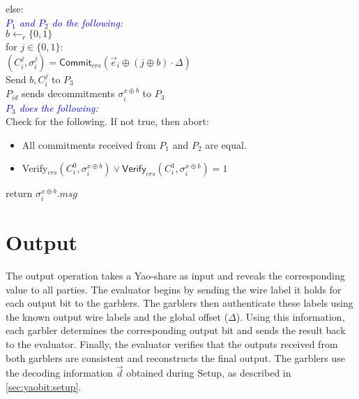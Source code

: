 \begin{protocol}[Input]
	\indent  else: \\
	\indent \indent \textcolor{blue}{\textit{$P_1$ and $P_2$ do the following:}} \\
	\indent \indent $b \gets_r \{0,1\}$ \\
	\indent \indent for $j \in \{0,1\}$: \\
	\indent \indent \indent $(C^j_i, \sigma^j_i) = \mathsf{Commit}_{crs}(\vec{e}_i \oplus (j \oplus b) \cdot \Delta)$\\
	\indent \indent \indent Send $b, C^j_i$ to $P_3$\\
	\indent \indent $P_{id}$ sends decommitments $\sigma^{x \oplus b}_i$ to $P_3$ \\
	\indent \indent \textcolor{blue}{\textit{$P_3$ does the following:}} \\
	\indent \indent Check for the following. If not true, then abort:
	\begin{itemize}[leftmargin=55pt] 
		\item \indent \indent \indent All commitments received from $P_1$ and $P_2$ are equal.
		\item \indent \indent \indent \textsf{Verify}$_{crs}(C^{0}_i, \sigma^{x \oplus b}_i) \vee \mathsf{Verify}_{crs}(C^{1}_i, \sigma^{x \oplus b}_i) = 1$
	\end{itemize}
	\indent \indent \indent return $\sigma^{x \oplus b}_i.msg$
\end{protocol}

\section{Output}

The output operation takes a Yao-share as input and reveals the corresponding value to all parties. The evaluator begins by sending the wire label it holds for each output bit to the garblers. The garblers then authenticate these labels using the known output wire labels and the global offset ($\Delta$). Using this information, each garbler determines the corresponding output bit and sends the result back to the evaluator. Finally, the evaluator verifies that the outputs received from both garblers are consistent and reconstructs the final output. The garblers use the decoding information $\vec{d}$ obtained during Setup, as described in \ref{sec:yaobit:setup}.

